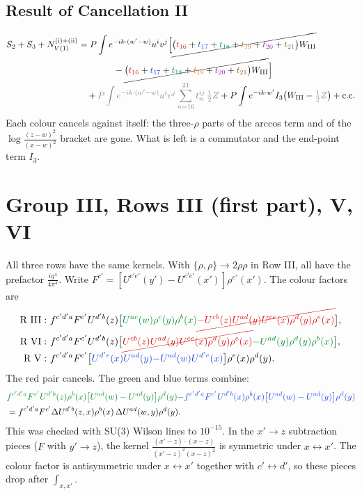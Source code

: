 \documentclass[10pt]{article}
\newcommand{\R}[1]{{\color{cR}#1}}
\newcommand{\B}[1]{{\color{cB}#1}}
\newcommand{\G}[1]{{\color{cG}#1}}
\newcommand{\Or}[1]{{\color{cO}#1}}
\newcommand{\Vi}[1]{{\color{cV}#1}}
\newcommand{\Br}[1]{{\color{cN}#1}}
\newcommand{\Gr}[1]{{\color{cX}#1}}
\begin{document}
\subsection*{Result of Cancellation II}
\begin{align}
S_{2}+S_{3}+N^{\rm(i)+(ii)}_{V(1)}&=P\int e^{-ik\cdot(w'-w)}u^{i}v^{j}\Big[\cancel{\big(\R{t_{16}}+\B{t_{17}}+\G{t_{18}}+\Or{t_{19}}+\Vi{t_{20}}+\Br{t_{21}}\big)W_{\rm III}}\notag\\&\qquad\qquad-\cancel{\big(\R{t_{16}}+\B{t_{17}}+\G{t_{18}}+\Or{t_{19}}+\Vi{t_{20}}+\Br{t_{21}}\big)W_{\rm III}}\Big]\notag\\
&\quad+\Gr{P\int e^{-ik\cdot(w'-w)}u^{i}v^{j}\sum_{n=16}^{21}t_{n}^{ij}\,\tfrac12Z}+P\int e^{-ik\cdot w'}I_{3}\big(W_{\rm III}-\Gr{\tfrac12Z}\big)+{\rm c.c.}
\end{align}
Each colour cancels against itself: the three-$\rho$ parts of the arccos term and of the $\log\frac{(z-w)^{2}}{(x-w)^{2}}$ bracket are gone. What is left is a \Gr{commutator} and the end-point term $I_{3}$.

\section{Group III, Rows III (first part), V, VI}
All three rows have the same kernels. With $\{\rho,\rho\}\to2\rho\rho$ in Row III, all have the prefactor $\frac{ig^{4}}{4\pi^{4}}$. Write $F^{c'}=[U^{c'e'}(y')-U^{c'e'}(x')]\rho^{e'}(x')$. The colour factors are
\begin{align}
\text{R III}:&\ f^{c'd'a}F^{c'}U^{d'b}(z)\big[\G{U^{ac}(w)\rho^{c}(y)\rho^{b}(x)}\R{\cancel{-U^{cb}(z)U^{ad}(y)U^{ce}(x)\rho^{d}(y)\rho^{e}(x)}}\big],\notag\\
\text{R VI}:&\ f^{c'd'a}F^{c'}U^{d'b}(z)\big[\R{\cancel{U^{cb}(z)U^{ad}(y)U^{ce}(x)\rho^{d}(y)\rho^{e}(x)}}\G{-U^{ad}(y)\rho^{d}(y)\rho^{b}(x)}\big],\notag\\
\text{R V}:&\ f^{c'd'a}F^{c'}\big[\B{U^{d'e}(x)U^{ad}(y)}\B{-U^{ad}(w)U^{d'e}(x)}\big]\rho^{e}(x)\rho^{d}(y).
\end{align}
The \R{red} pair cancels. The \G{green} and \B{blue} terms combine:
\begin{align}
&\G{f^{c'd'a}F^{c'}U^{d'b}(z)\rho^{b}(x)\big[U^{ad}(w)-U^{ad}(y)\big]\rho^{d}(y)}\B{-f^{c'd'a}F^{c'}U^{d'b}(x)\rho^{b}(x)\big[U^{ad}(w)-U^{ad}(y)\big]\rho^{d}(y)}\notag\\
&=f^{c'd'a}F^{c'}\Delta U^{d'b}(z,x)\rho^{b}(x)\,\Delta U^{ad}(w,y)\rho^{d}(y).
\end{align}
This was checked with SU(3) Wilson lines to $10^{-15}$. In the $x'\to z$ subtraction pieces ($F$ with $y'\to z$), the kernel $\frac{(x'-z)\cdot(x-z)}{(x'-z)^{2}(x-z)^{2}}$ is symmetric under $x\leftrightarrow x'$. The colour factor is antisymmetric under $x\leftrightarrow x'$ together with $c'\leftrightarrow d'$, so these pieces drop after $\int_{x,x'}$.
\end{document}
